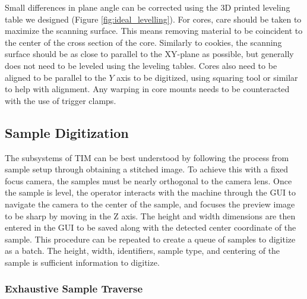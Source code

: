 \documentclass[a4paper,12pt]{article}
\begin{document}
Small differences in plane angle can be corrected using the 3D printed leveling table we designed (Figure \ref{fig:ideal_levelling}). 
For cores, care should be taken to maximize the scanning surface. This means removing material to be coincident to the center of the cross section of the core. 
Similarly to cookies, the scanning surface should be as close to parallel to the XY-plane as possible, but generally does not need to be leveled using the leveling tables.
Cores also need to be aligned to be parallel to the $Y$ axis to be digitized, using squaring tool or similar to help with alignment. Any warping in core mounts needs to be counteracted with the use of trigger clamps. 

\subsection{Sample Digitization} %

The subsystems of TIM can be best understood by following the process from sample setup through obtaining a stitched image. 
To achieve this with a fixed focus camera, the samples must be nearly orthogonal to the camera lens. 
Once the sample is level, the operator interacts with the machine through the GUI to navigate the camera to the center of the sample, and focuses the preview image to be sharp by moving in the Z axis. The height and width dimensions are then entered in the GUI
to be saved along with the detected center coordinate of the sample. This procedure can be repeated to create a queue of samples to digitize as a batch.
The height, width, identifiers, sample type, and centering of the sample is sufficient information to digitize.

\subsubsection{Exhaustive Sample Traverse}  
\end{document}
